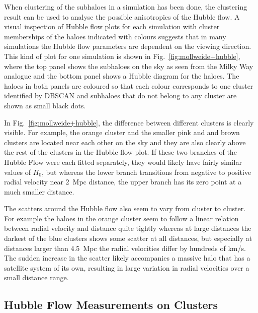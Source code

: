 \documentclass[english, oneside]{HYgradu}
\begin{document}
When clustering of the subhaloes in a simulation has been done, the clustering result can be used to analyse the possible anisotropies of the Hubble flow. A visual inspection of Hubble flow plots for each simulation with cluster memberships of the haloes indicated with colours suggests that in many simulations the Hubble flow parameters are dependent on the viewing direction. This kind of plot for one simulation is shown in Fig.~\ref{fig:mollweide+hubble}, where the top panel shows the subhaloes on the sky as seen from the Milky Way analogue and the bottom panel shows a Hubble diagram for the haloes. The haloes in both panels are coloured so that each colour corresponds to one cluster identified by DBSCAN and subhaloes that do not belong to any cluster are shown as small black dots. 

In Fig.~\ref{fig:mollweide+hubble}, the difference between different clusters is clearly visible. For example, the orange cluster and the smaller pink and and brown clusters are located near each other on the sky and they are also clearly above the rest of the clusters in the Hubble flow plot. If these two branches of the Hubble Flow were each fitted separately, they would likely have fairly similar values of $H_0$, but whereas the lower branch transitions from negative to positive radial velocity near 2~Mpc distance, the upper branch has its zero point at a much smaller distance.

The scatters around the Hubble flow also seem to vary from cluster to cluster. For example the haloes in the orange cluster seem to follow a linear relation between radial velocity and distance quite tightly whereas at large distances the darkest of the blue clusters shows some scatter at all distances, but especially at distances larger than 4.5~Mpc the radial velocities differ by hundreds of km/s. The sudden increase in the scatter likely accompanies a massive halo that has a satellite system of its own, resulting in large variation in radial velocities over a small distance range.


\subsection{Hubble Flow Measurements on Clusters} \label{sect:clustermeasurements}
\end{document}
